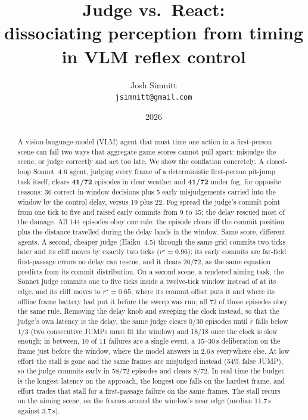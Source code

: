\documentclass[11pt]{article}
\title{\textbf{Judge vs.\ React:\\ dissociating perception from timing in VLM reflex control}}
\author{Josh Simnitt\\ \small\texttt{jsimnitt@gmail.com}}
\date{2026}
\newcommand{\rstar}{r^{\star}}
\begin{document}
\maketitle

\begin{abstract}
A vision-language-model (VLM) agent that must time one action in a
first-person scene can fail two ways that aggregate game scores cannot pull
apart: misjudge the scene, or judge correctly and act too late. We show the
conflation concretely. A closed-loop Sonnet~4.6 agent, judging every frame of
a deterministic first-person pit-jump task itself, clears \textbf{41/72}
episodes in clear weather and \textbf{41/72} under fog, for opposite reasons:
36 correct in-window decisions plus 5 early misjudgements carried into the
window by the control delay, versus 19 plus 22. Fog spread the judge's commit
point from one tick to five and raised early commits from 9 to 35; the delay
rescued most of the damage. All 144 episodes obey one rule: the episode
clears iff the commit position plus the distance travelled during the delay
lands in the window. Same score, different agents. A second, cheaper judge
(Haiku~4.5) through the same grid commits two ticks later and its cliff
moves by exactly two ticks ($\rstar = 0.96$); its early commits are
far-field first-passage errors no delay can rescue, and it clears 26/72, as
the same equation predicts from its commit distribution. On a second
scene, a rendered aiming task, the Sonnet judge commits one to five ticks
inside a twelve-tick window instead of at its edge, and its cliff moves to
$\rstar = 0.65$, where its commit offset puts it and where its offline
frame battery had put it before the sweep was run; all 72 of those episodes
obey the same rule. Removing the delay knob
and sweeping the clock instead, so that the judge's own latency is the
delay, the same judge clears 0/30 episodes until $r$ falls below $1/3$ (two
consecutive JUMPs must fit the window) and 18/18 once the clock is slow
enough; in between, 10 of 11 failures are a single event, a 15--30\,s
deliberation on the frame just before the window, where the model answers
in 2.6\,s everywhere else. At low effort the stall is gone and the same
frames are misjudged instead (54\% false JUMP), so the judge commits early
in 58/72 episodes and clears 8/72. In real time the budget is the longest
latency on the approach, the longest one falls on the hardest frame, and
effort trades that stall for a first-passage failure on the same frames.
The stall recurs on the aiming scene, on the frames around the window's
near edge (median 11.7\,s against 3.7\,s).


\end{abstract}
\end{document}
